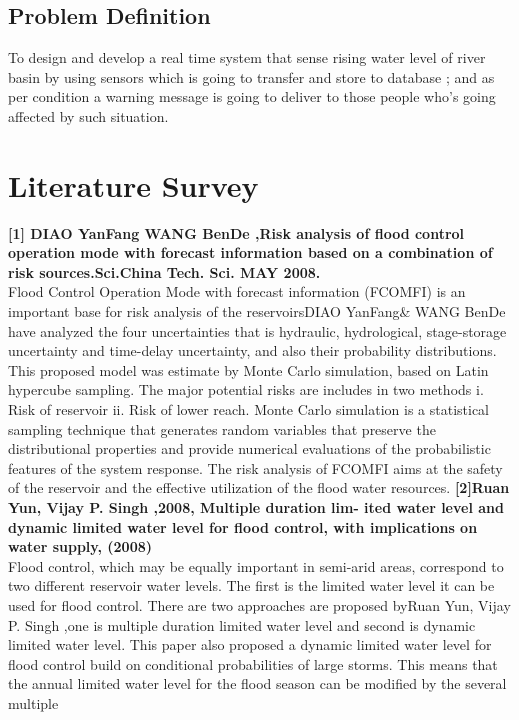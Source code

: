 \documentclass[a4paper,12pt]{report}
\begin{document}
\section{Problem Definition}
To design and develop a real time system that sense rising water level of river basin by using sensors which is going to transfer and store to database ; and as per condition a warning message is going to deliver to those people who’s going affected by such situation.



\chapter {Literature Survey}
\textbf{[1] DIAO YanFang WANG BenDe ,Risk analysis of flood
control operation mode with forecast information based
on a combination of risk sources.Sci.China Tech.
Sci. MAY 2008.}\\
Flood Control Operation Mode with forecast information (FCOMFI) is an important base for risk analysis
of the reservoirsDIAO YanFang\& WANG BenDe have analyzed the four uncertainties that is hydraulic, hydrological,
stage-storage uncertainty and time-delay uncertainty, and also their probability distributions. This proposed model was
estimate by Monte Carlo simulation, based on Latin hypercube sampling. The major potential risks are includes in two
methods i. Risk of reservoir ii. Risk of lower reach. Monte Carlo simulation is a statistical sampling technique that
generates random variables that preserve the distributional properties and provide numerical evaluations of the
probabilistic features of the system response. The risk analysis of FCOMFI aims at the safety of the reservoir and the
effective utilization of the flood water resources.
\textbf{[2]Ruan Yun, Vijay P. Singh ,2008, Multiple duration lim-
ited water level and dynamic limited water level for
flood control, with implications on water supply, (2008) }\\
 Flood control, which may be equally important in semi-arid areas, correspond to two different reservoir
water levels. The first is the limited water level it can be used for flood control. There are two approaches are proposed
byRuan Yun, Vijay P. Singh ,one is multiple duration limited water level and second is dynamic limited water level.
This paper also proposed a dynamic limited water level for flood control build on conditional probabilities of large
storms. This means that the annual limited water level for the flood season can be modified by the several multiple
\end{document}
